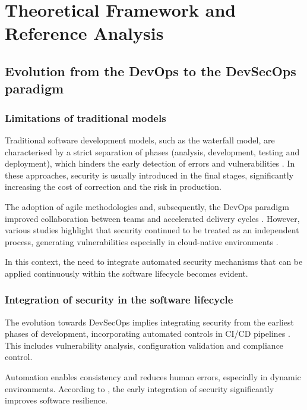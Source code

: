\chapter{Theoretical Framework and Reference Analysis}

\section{Evolution from the DevOps to the DevSecOps paradigm}

\subsection{Limitations of traditional models}

Traditional software development models, such as the waterfall model, are characterised by a strict separation of phases (analysis, development, testing and deployment), which hinders the early detection of errors and vulnerabilities \cite{pressman2019software}. In these approaches, security is usually introduced in the final stages, significantly increasing the cost of correction and the risk in production.

The adoption of agile methodologies and, subsequently, the DevOps paradigm improved collaboration between teams and accelerated delivery cycles \cite{kim2016devops}. However, various studies highlight that security continued to be treated as an independent process, generating vulnerabilities especially in cloud-native environments \cite{sharma2020devsecops}.

In this context, the need to integrate automated security mechanisms that can be applied continuously within the software lifecycle becomes evident.

\subsection{Integration of security in the software lifecycle}

The evolution towards DevSecOps implies integrating security from the earliest phases of development, incorporating automated controls in CI/CD pipelines \cite{behl2017devsecops}. This includes vulnerability analysis, configuration validation and compliance control.

Automation enables consistency and reduces human errors, especially in dynamic environments. According to \cite{rahman2019devsecops}, the early integration of security significantly improves software resilience.

